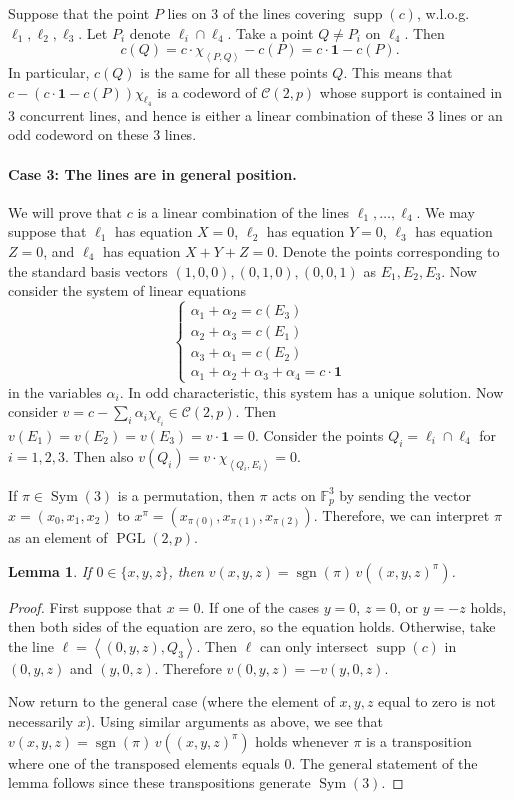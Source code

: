 \documentclass[12pt, a4paper]{article}
\newtheorem{lm}[thm]{Lemma}
\theoremstyle{definition}
\newcommand{\FF}{\mathbb F}
\newcommand{\vspan}[1]{\left \langle #1 \right \rangle}
\newcommand{\one}{\mathbf 1}
\newcommand{\mc}{\mathcal C}
\DeclareMathOperator{\supp}{supp}
\DeclareMathOperator{\PGL}{PGL}
\DeclareMathOperator{\Sym}{Sym}
\DeclareMathOperator{\sgn}{sgn}
\begin{document}
Suppose that the point $P$ lies on 3 of the lines covering $\supp(c)$, w.l.o.g.\ $\ell_1,\ell_2,\ell_3$.
Let $P_i$ denote $\ell_i \cap \ell_4$.
Take a point $Q \neq P_i$ on $\ell_4$.
Then 
\[
 c(Q) = c \cdot \chi_{\vspan{P,Q}} - c(P) = c \cdot \one - c(P).
\]
In particular, $c(Q)$ is the same for all these points $Q$.
This means that $c - (c \cdot \one - c(P)) \chi_{\ell_4}$ is a codeword of $\mc(2,p)$ whose support is contained in 3 concurrent lines, and hence is either a linear combination of these 3 lines or an odd codeword on these 3 lines.

\paragraph{Case 3: The lines are in general position.}

We will prove that $c$ is a linear combination of the lines $\ell_1,\dots, \ell_4$.
We may suppose that $\ell_1$ has equation $X=0$, $\ell_2$ has equation $Y=0$, $\ell_3$ has equation $Z=0$, and $\ell_4$ has equation $X+Y+Z=0$.
Denote the points corresponding to the standard basis vectors $(1,0,0), (0,1,0), (0,0,1)$ as $E_1,E_2,E_3$.
Now consider the system of linear equations
\[
 \begin{cases}
  \alpha_1 + \alpha_2 = c(E_3) \\
  \alpha_2 + \alpha_3 = c(E_1) \\
  \alpha_3 + \alpha_1 = c(E_2) \\
  \alpha_1 + \alpha_2 + \alpha_3 + \alpha_4 = c \cdot \one
 \end{cases}
\]
in the variables $\alpha_i$.
In odd characteristic, this system has a unique solution.
Now consider $v = c - \sum_i \alpha_i \chi_{\ell_i} \in \mc(2,p)$.
Then $v(E_1) = v(E_2) = v(E_3) = v \cdot \one = 0$.
Consider the points $Q_i = \ell_i \cap \ell_4$ for $i = 1,2,3$.
Then also $v(Q_i) = v \cdot \chi_{\vspan{Q_i,E_i}} = 0$.

If $\pi \in \Sym(3)$ is a permutation, then $\pi$ acts on $\FF_p^3$ by sending the vector $x = (x_0,x_1,x_2)$ to $x^\pi = \left( x_{\pi(0)},x_{\pi(1)},x_{\pi(2)} \right)$.
Therefore, we can interpret $\pi$ as an element of $\PGL(2,p)$.

\begin{lm}
 \label{Lm:Permutation}
 If $0 \in \{x,y,z\}$, then $v(x,y,z) = \sgn(\pi) \, v((x,y,z)^\pi)$.
\end{lm}

\begin{proof}
 First suppose that $x=0$.
 If one of the cases $y=0$, $z=0$, or $y=-z$ holds, then both sides of the equation are zero, so the equation holds.
 Otherwise, take the line $\ell = \vspan{(0,y,z),Q_3}$.
 Then $\ell$ can only intersect $\supp(c)$ in $(0,y,z)$ and $(y,0,z)$.
 Therefore $v(0,y,z) = -v(y,0,z)$.
 
 Now return to the general case (where the element of $x,y,z$ equal to zero is not necessarily $x$).
 Using similar arguments as above, we see that $v(x,y,z) = \sgn(\pi) \, v((x,y,z)^\pi)$ holds whenever $\pi$ is a transposition where one of the transposed elements equals $0$.
 The general statement of the lemma follows since these transpositions generate $\Sym(3)$.
\end{proof}
\end{document}

